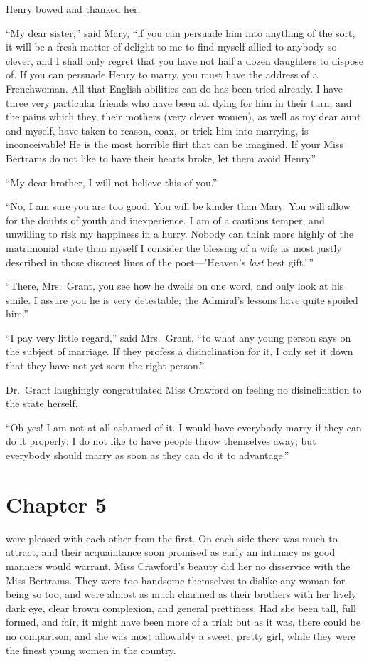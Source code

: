 Henry bowed and thanked her.

``My dear sister,'' said Mary, ``if you can persuade him
into anything of the sort, it will be a fresh matter of
delight to me to find myself allied to anybody so clever,
and I shall only regret that you have not half a dozen
daughters to dispose of.  If you can persuade Henry
to marry, you must have the address of a Frenchwoman.
All that English abilities can do has been tried already.
I have three very particular friends who have been all
dying for him in their turn; and the pains which they,
their mothers (very clever women), as well as my dear
aunt and myself, have taken to reason, coax, or trick
him into marrying, is inconceivable!  He is the most
horrible flirt that can be imagined.  If your Miss
Bertrams do not like to have their hearts broke, let them
avoid Henry.''

``My dear brother, I will not believe this of you.''

``No, I am sure you are too good.  You will be kinder than Mary.
You will allow for the doubts of youth and inexperience.
I am of a cautious temper, and unwilling to risk my
happiness in a hurry.  Nobody can think more highly of
the matrimonial state than myself I consider the blessing
of a wife as most justly described in those discreet
lines of the poet---'Heaven's \emph{last} best gift.'\,''

``There, Mrs.\ Grant, you see how he dwells on one word,
and only look at his smile.  I assure you he is very detestable;
the Admiral's lessons have quite spoiled him.''

``I pay very little regard,'' said Mrs.\ Grant, ``to what
any young person says on the subject of marriage.
If they profess a disinclination for it, I only set it
down that they have not yet seen the right person.''

Dr.\ Grant laughingly congratulated Miss Crawford
on feeling no disinclination to the state herself.

``Oh yes!  I am not at all ashamed of it.  I would
have everybody marry if they can do it properly:
I do not like to have people throw themselves away;
but everybody should marry as soon as they can do it
to advantage.''



\chapter{Chapter 5}

 were pleased with each other from
the first.  On each side there was much to attract,
and their acquaintance soon promised as early an intimacy
as good manners would warrant.  Miss Crawford's
beauty did her no disservice with the Miss Bertrams.
They were too handsome themselves to dislike any woman
for being so too, and were almost as much charmed as their
brothers with her lively dark eye, clear brown complexion,
and general prettiness.  Had she been tall, full formed,
and fair, it might have been more of a trial:  but as it was,
there could be no comparison; and she was most allowably
a sweet, pretty girl, while they were the finest young
women in the country.

